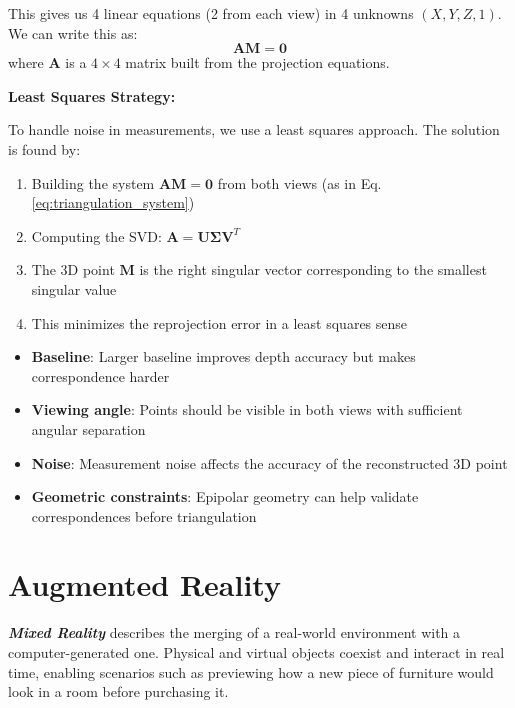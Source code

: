 \documentclass[11pt,a4paper]{article}
\theoremstyle{definition}
\theoremstyle{plain}
\theoremstyle{remark}
\begin{document}
This gives us 4 linear equations (2 from each view) in 4 unknowns $(X, Y, Z, 1)$. We can write this as:
\begin{equation} \label{eq:triangulation_system}
    \mathbf{A} \mathbf{M} = \mathbf{0}
\end{equation}
where $\mathbf{A}$ is a $4 \times 4$ matrix built from the projection equations.

\textbf{Least Squares Strategy:}

To handle noise in measurements, we use a least squares approach. The solution is found by:

\begin{enumerate}
    \item Building the system $\mathbf{A} \mathbf{M} = \mathbf{0}$ from both views (as in Eq. \eqref{eq:triangulation_system})
    \item Computing the SVD: $\mathbf{A} = \mathbf{U} \boldsymbol{\Sigma} \mathbf{V}^T$
    \item The 3D point $\mathbf{M}$ is the right singular vector corresponding to the smallest singular value
    \item This minimizes the reprojection error in a least squares sense
\end{enumerate}

\begin{tcolorbox}[colback=red!5!white,colframe=red!75!black,title=\textbf{Triangulation Considerations}]
\begin{itemize}
    \item \textbf{Baseline}: Larger baseline improves depth accuracy but makes correspondence harder
    \item \textbf{Viewing angle}: Points should be visible in both views with sufficient angular separation
    \item \textbf{Noise}: Measurement noise affects the accuracy of the reconstructed 3D point
    \item \textbf{Geometric constraints}: Epipolar geometry can help validate correspondences before triangulation
\end{itemize}
\end{tcolorbox}

\section{Augmented Reality}
\textbf{\textit{Mixed Reality}} describes the merging of a real-world environment with a computer-generated one.
Physical and virtual objects coexist and interact in real time, enabling scenarios such as previewing
how a new piece of furniture would look in a room before purchasing it.
\end{document}
